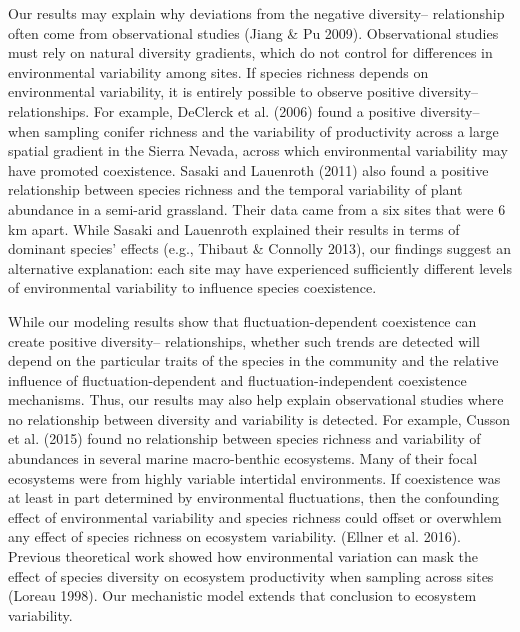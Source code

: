 \documentclass[12pt,]{article}
\begin{document}
Our results may explain why deviations from the negative
diversity-- relationship often come from
observational studies (Jiang \& Pu 2009). Observational studies must
rely on natural diversity gradients, which do not control for
differences in environmental variability among sites. If species
richness depends on environmental variability, it is entirely possible
to observe positive diversity--
relationships. For example, DeClerck et al. (2006) found a positive
diversity-- when sampling conifer richness
and the variability of productivity across a large spatial gradient in
the Sierra Nevada, across which environmental variability may have
promoted coexistence. Sasaki and Lauenroth (2011) also found a positive
relationship between species richness and the temporal variability of
plant abundance in a semi-arid grassland. Their data came from a six
sites that were 6 km apart. While Sasaki and Lauenroth explained their
results in terms of dominant species' effects (e.g., Thibaut \& Connolly
2013), our findings suggest an alternative explanation: each site may
have experienced sufficiently different levels of environmental
variability to influence species coexistence.

While our modeling results show that fluctuation-dependent coexistence
can create positive diversity--
relationships, whether such trends are detected will depend on the
particular traits of the species in the community and the relative
influence of fluctuation-dependent and fluctuation-independent
coexistence mechanisms. Thus, our results may also help explain
observational studies where no relationship between diversity and
variability is detected. For example, Cusson et al. (2015) found no
relationship between species richness and variability of abundances in
several marine macro-benthic ecosystems. Many of their focal ecosystems
were from highly variable intertidal environments. If coexistence was at
least in part determined by environmental fluctuations, then the
confounding effect of environmental variability and species richness
could offset or overwhlem any effect of species richness on ecosystem
variability.
(Ellner et al. 2016). Previous theoretical work showed how environmental
variation can mask the effect of species diversity on ecosystem
productivity when sampling across sites (Loreau 1998). Our mechanistic
model extends that conclusion to ecosystem variability.
\end{document}
